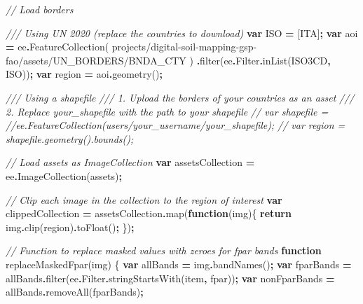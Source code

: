 \documentclass[
  10pt,
  b5paper,
  oneside]{book}
\newenvironment{Shaded}{\begin{snugshade}}{\end{snugshade}}
\newcommand{\AttributeTok}[1]{\textcolor[rgb]{0.77,0.63,0.00}{#1}}
\newcommand{\CommentTok}[1]{\textcolor[rgb]{0.56,0.35,0.01}{\textit{#1}}}
\newcommand{\ControlFlowTok}[1]{\textcolor[rgb]{0.13,0.29,0.53}{\textbf{#1}}}
\newcommand{\FunctionTok}[1]{\textcolor[rgb]{0.00,0.00,0.00}{#1}}
\newcommand{\KeywordTok}[1]{\textcolor[rgb]{0.13,0.29,0.53}{\textbf{#1}}}
\newcommand{\NormalTok}[1]{#1}
\newcommand{\OperatorTok}[1]{\textcolor[rgb]{0.81,0.36,0.00}{\textbf{#1}}}
\newcommand{\StringTok}[1]{\textcolor[rgb]{0.31,0.60,0.02}{#1}}
\begin{document}
\begin{Shaded}
\begin{Highlighting}[]
\CommentTok{// Load borders }

\CommentTok{/// Using UN 2020 (replace the countries to download)}
\KeywordTok{var}\NormalTok{ ISO }\OperatorTok{=}\NormalTok{ [}\StringTok{\textquotesingle{}ITA\textquotesingle{}}\NormalTok{]}\OperatorTok{;}
\KeywordTok{var}\NormalTok{ aoi }\OperatorTok{=}
\NormalTok{ee}\OperatorTok{.}\FunctionTok{FeatureCollection}\NormalTok{(}
\StringTok{\textquotesingle{}projects/digital{-}soil{-}mapping{-}gsp{-}fao/assets/UN\_BORDERS/BNDA\_CTY\textquotesingle{}}
\NormalTok{)}
  \OperatorTok{.}\FunctionTok{filter}\NormalTok{(ee}\OperatorTok{.}\AttributeTok{Filter}\OperatorTok{.}\FunctionTok{inList}\NormalTok{(}\StringTok{\textquotesingle{}ISO3CD\textquotesingle{}}\OperatorTok{,}\NormalTok{ ISO))}\OperatorTok{;}
\KeywordTok{var}\NormalTok{ region }\OperatorTok{=}\NormalTok{ aoi}\OperatorTok{.}\FunctionTok{geometry}\NormalTok{()}\OperatorTok{;}

\CommentTok{/// Using a shapefile}
\CommentTok{/// 1. Upload the borders of your countries as an asset}
\CommentTok{/// 2. Replace \textquotesingle{}your\_shapefile\textquotesingle{} with the path to your shapefile}
\CommentTok{// var shapefile = }
\CommentTok{//ee.FeatureCollection(\textquotesingle{}users/your\_username/your\_shapefile\textquotesingle{});}
\CommentTok{// var region = shapefile.geometry().bounds();}


\CommentTok{// Load assets as ImageCollection}
\KeywordTok{var}\NormalTok{ assetsCollection }\OperatorTok{=}\NormalTok{ ee}\OperatorTok{.}\FunctionTok{ImageCollection}\NormalTok{(assets)}\OperatorTok{;}

\CommentTok{// Clip each image in the collection to the region of interest}
\KeywordTok{var}\NormalTok{ clippedCollection }\OperatorTok{=}\NormalTok{ assetsCollection}\OperatorTok{.}\FunctionTok{map}\NormalTok{(}\KeywordTok{function}\NormalTok{(img)\{}
  \ControlFlowTok{return}\NormalTok{ img}\OperatorTok{.}\FunctionTok{clip}\NormalTok{(region)}\OperatorTok{.}\FunctionTok{toFloat}\NormalTok{()}\OperatorTok{;}
\NormalTok{\})}\OperatorTok{;}

\CommentTok{// Function to replace masked values with zeroes for fpar bands}
\KeywordTok{function} \FunctionTok{replaceMaskedFpar}\NormalTok{(img) \{}
  \KeywordTok{var}\NormalTok{ allBands }\OperatorTok{=}\NormalTok{ img}\OperatorTok{.}\FunctionTok{bandNames}\NormalTok{()}\OperatorTok{;}
  \KeywordTok{var}\NormalTok{ fparBands }\OperatorTok{=}
\NormalTok{  allBands}\OperatorTok{.}\FunctionTok{filter}\NormalTok{(ee}\OperatorTok{.}\AttributeTok{Filter}\OperatorTok{.}\FunctionTok{stringStartsWith}\NormalTok{(}\StringTok{\textquotesingle{}item\textquotesingle{}}\OperatorTok{,} \StringTok{\textquotesingle{}fpar\textquotesingle{}}\NormalTok{))}\OperatorTok{;}
  \KeywordTok{var}\NormalTok{ nonFparBands }\OperatorTok{=}\NormalTok{ allBands}\OperatorTok{.}\FunctionTok{removeAll}\NormalTok{(fparBands)}\OperatorTok{;}
  

\end{Highlighting}
\end{Shaded}
\end{document}

